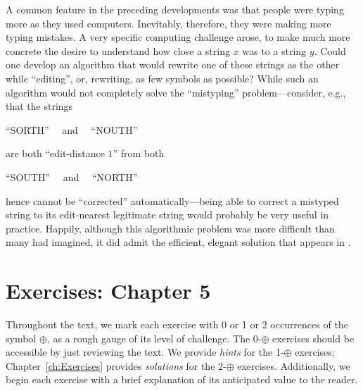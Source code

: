 A common feature in the preceding developments was that people were typing more as they used computers.  Inevitably, therefore, they were making more typing mistakes.  A very specific computing challenge arose, to make much more concrete the desire to understand how close a
string $x$ was to a string $y$.  Could one develop an algorithm that would rewrite one of these strings as the other while ``editing'', or, rewriting, as few symbols as possible?  While such an algorithm would not completely solve the ``mistyping'' problem---consider, e.g., that the strings

\hspace*{.25in} ``SORTH'' \ \ and \ \ ``NOUTH''

\noindent
are both ``edit-distance $1$'' from both

\hspace*{.25in} ``SOUTH'' \ \ and \ \ ``NORTH''

\noindent
hence cannot be ``corrected'' automatically---being able to correct a mistyped string to its edit-nearest legitimate string would probably be very useful in practice.  Happily, although this algorithmic problem was more difficult than many had imagined, it did admit the efficient, elegant solution that appears in \cite{WagnerF74}.



\section{Exercises: Chapter 5}

Throughout the text, we mark each exercise with 0 or 1 or 2 occurrences of the symbol $\oplus$, as a rough gauge of its level of challenge.  The 0-$\oplus$ exercises should be accessible by just reviewing the text.  We provide {\em hints} for the 1-$\oplus$ exercises; Chapter~\ref{ch:Exercises} provides {\em solutions} for the 2-$\oplus$ exercises.  Additionally, we begin each exercise with a brief explanation of its anticipated value to the reader.
 
